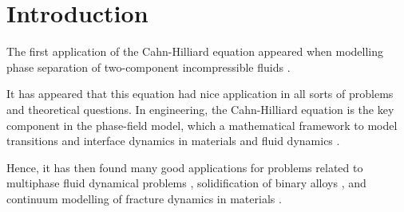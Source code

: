 \section{Introduction}\label{sec:introduction}



The first application of the Cahn-Hilliard equation appeared when modelling phase separation of two-component incompressible fluids \cite{cahn1958free, cahn1959free, falk1992cahn}.


It has appeared that this equation had nice application in all sorts of problems
and theoretical questions. In engineering, the Cahn-Hilliard equation is the key component in
the phase-field model, which a mathematical framework to model transitions and interface dynamics in materials and fluid dynamics \cite{steinbach2009phase, chen2002phase}.

Hence, it has then found many good applications for problems related to
multiphase fluid dynamical problems \cite{badalassi2003computation, li2016lattice, kim2012phase, shen2010phase}, solidification of binary alloys \cite{kim1999phase, echebarria2004quantitative}, and continuum modelling of fracture dynamics in
materials \cite{kuhn2010continuum, li2015phase}.










